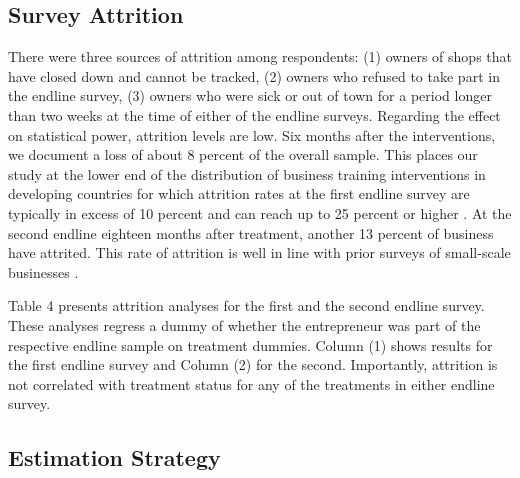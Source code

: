 \documentclass[11.5pt]{article}
\begin{document}
\subsection{Survey Attrition}

There were three sources of attrition among respondents: (1) owners of shops that have closed down and cannot be tracked, (2) owners who refused to take part in the endline survey, (3) owners who were sick or out of town for a period longer than two weeks at the time of either of the endline surveys. Regarding the effect on statistical power, attrition levels are low. Six months after the interventions, we document a loss of about 8 percent of the overall sample. This places our study at the lower end of the distribution of business training interventions in developing countries for which attrition rates at the first endline survey are typically in excess of 10 percent and can reach up to 25 percent or higher \citep[for a review, see][]{McKenzie2014}. At the second endline eighteen months after treatment, another 13 percent of business have attrited. %
This rate of attrition is well in line with prior surveys of small-scale businesses \citep{McKenzie2014}.

Table 4 presents attrition analyses for the first and the second endline survey. These analyses regress a dummy of whether the entrepreneur was part of the respective endline sample on treatment dummies. Column (1) shows results for the first endline survey and Column (2) for the second. Importantly, attrition is not correlated with treatment status for any of the treatments in either endline survey.

\subsection{Estimation Strategy}

\end{document}
